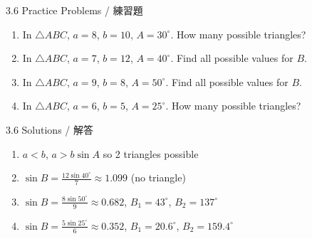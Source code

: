 \documentclass[aspectratio=169]{beamer}
\begin{document}
\begin{frame}{3.6 Practice Problems / 練習題}
    \begin{tcolorbox}[colback=lightgray,colframe=accent,title=Practice]
        \footnotesize
        \begin{enumerate}
            \item In $\triangle ABC$, $a=8$, $b=10$, $A=30^\circ$. How many possible triangles?
            \item In $\triangle ABC$, $a=7$, $b=12$, $A=40^\circ$. Find all possible values for $B$.
            \item In $\triangle ABC$, $a=9$, $b=8$, $A=50^\circ$. Find all possible values for $B$.
            \item In $\triangle ABC$, $a=6$, $b=5$, $A=25^\circ$. How many possible triangles?
        \end{enumerate}
    \end{tcolorbox}
\end{frame}

\begin{frame}{3.6 Solutions / 解答}
    \begin{tcolorbox}[colback=lightgray,colframe=accent,title=Solutions]
        \footnotesize
        \begin{enumerate}
            \item $a < b$, $a > b \sin A$ so 2 triangles possible
            \item $\sin B = \frac{12 \sin 40^\circ}{7} \approx 1.099$ (no triangle)
            \item $\sin B = \frac{8 \sin 50^\circ}{9} \approx 0.682$, $B_1 = 43^\circ$, $B_2 = 137^\circ$
            \item $\sin B = \frac{5 \sin 25^\circ}{6} \approx 0.352$, $B_1 = 20.6^\circ$, $B_2 = 159.4^\circ$
        \end{enumerate}
    \end{tcolorbox}
\end{frame}
\end{document}
